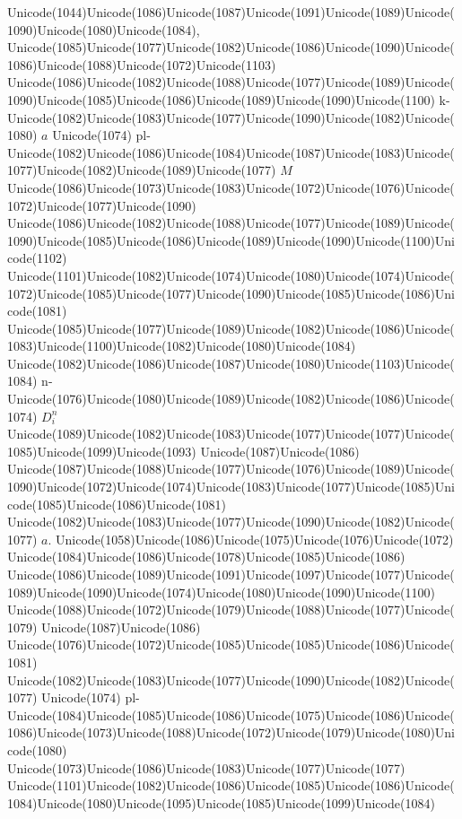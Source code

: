 \documentclass[a4paper,11pt]{report}
\begin{document}
{{{ Unicode(1044)Unicode(1086)Unicode(1087)Unicode(1091)Unicode(1089)Unicode(1090)Unicode(1080)Unicode(1084),
Unicode(1085)Unicode(1077)Unicode(1082)Unicode(1086)Unicode(1090)Unicode(1086)Unicode(1088)Unicode(1072)Unicode(1103)
Unicode(1086)Unicode(1082)Unicode(1088)Unicode(1077)Unicode(1089)Unicode(1090)Unicode(1085)Unicode(1086)Unicode(1089)Unicode(1090)Unicode(1100)
k-Unicode(1082)Unicode(1083)Unicode(1077)Unicode(1090)Unicode(1082)Unicode(1080) $a$ Unicode(1074)
pl-Unicode(1082)Unicode(1086)Unicode(1084)Unicode(1087)Unicode(1083)Unicode(1077)Unicode(1082)Unicode(1089)Unicode(1077) $M$ Unicode(1086)Unicode(1073)Unicode(1083)Unicode(1072)Unicode(1076)Unicode(1072)Unicode(1077)Unicode(1090)
Unicode(1086)Unicode(1082)Unicode(1088)Unicode(1077)Unicode(1089)Unicode(1090)Unicode(1085)Unicode(1086)Unicode(1089)Unicode(1090)Unicode(1100)Unicode(1102)
Unicode(1101)Unicode(1082)Unicode(1074)Unicode(1080)Unicode(1074)Unicode(1072)Unicode(1085)Unicode(1077)Unicode(1090)Unicode(1085)Unicode(1086)Unicode(1081)
Unicode(1085)Unicode(1077)Unicode(1089)Unicode(1082)Unicode(1086)Unicode(1083)Unicode(1100)Unicode(1082)Unicode(1080)Unicode(1084)
Unicode(1082)Unicode(1086)Unicode(1087)Unicode(1080)Unicode(1103)Unicode(1084)
n-Unicode(1076)Unicode(1080)Unicode(1089)Unicode(1082)Unicode(1086)Unicode(1074) $D^n_i$ Unicode(1089)Unicode(1082)Unicode(1083)Unicode(1077)Unicode(1077)Unicode(1085)Unicode(1099)Unicode(1093)
Unicode(1087)Unicode(1086)
Unicode(1087)Unicode(1088)Unicode(1077)Unicode(1076)Unicode(1089)Unicode(1090)Unicode(1072)Unicode(1074)Unicode(1083)Unicode(1077)Unicode(1085)Unicode(1085)Unicode(1086)Unicode(1081)
Unicode(1082)Unicode(1083)Unicode(1077)Unicode(1090)Unicode(1082)Unicode(1077) $a.$ Unicode(1058)Unicode(1086)Unicode(1075)Unicode(1076)Unicode(1072)
Unicode(1084)Unicode(1086)Unicode(1078)Unicode(1085)Unicode(1086)
Unicode(1086)Unicode(1089)Unicode(1091)Unicode(1097)Unicode(1077)Unicode(1089)Unicode(1090)Unicode(1074)Unicode(1080)Unicode(1090)Unicode(1100)
Unicode(1088)Unicode(1072)Unicode(1079)Unicode(1088)Unicode(1077)Unicode(1079)
Unicode(1087)Unicode(1086)
Unicode(1076)Unicode(1072)Unicode(1085)Unicode(1085)Unicode(1086)Unicode(1081)
Unicode(1082)Unicode(1083)Unicode(1077)Unicode(1090)Unicode(1082)Unicode(1077)
Unicode(1074)
pl-Unicode(1084)Unicode(1085)Unicode(1086)Unicode(1075)Unicode(1086)Unicode(1086)Unicode(1073)Unicode(1088)Unicode(1072)Unicode(1079)Unicode(1080)Unicode(1080)
Unicode(1073)Unicode(1086)Unicode(1083)Unicode(1077)Unicode(1077)
Unicode(1101)Unicode(1082)Unicode(1086)Unicode(1085)Unicode(1086)Unicode(1084)Unicode(1080)Unicode(1095)Unicode(1085)Unicode(1099)Unicode(1084)
}}}
\end{document}
